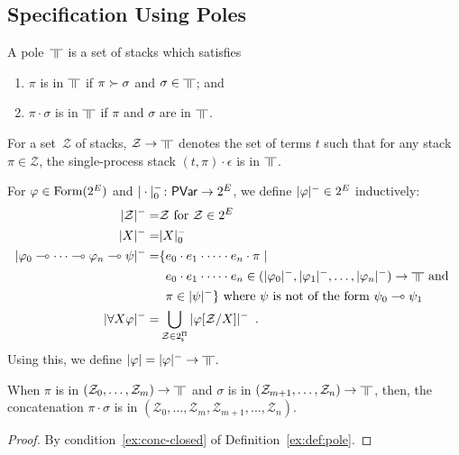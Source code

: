 \subsection{Specification Using Poles}

\begin{definition}
 \label{ex:def:pole}
A pole~$\bbot$ is a set of stacks
which satisfies
\begin{enumerate}
 \item \label{ex:red-closed} $\pi$ is in $\bbot$ if $\pi\succ \sigma$ and
       $\sigma\in\bbot$; and
 \item \label{ex:conc-closed} $\pi\cdot \sigma$ is in $\bbot$ if $\pi$
       and $\sigma$ are in $\bbot$.
\end{enumerate}
\end{definition}

For a set~$\mathcal Z$ of
stacks, $\mathcal Z\rightarrow\bbot$ denotes
the set of
terms
$t$ such that
for any
stack $\pi\in\mathcal Z$,
the single-process stack $(t,\pi)\cdot\epsilon$ is in $\bbot$.



For $\varphi\in\mathop{\text{Form}}(2^E)$ and $|\cdot|^-_0\colon\mathsf{PVar}\rightarrow 2^E$\kern
-2pt,
we define $|{\varphi}|^-\in
2^E$ inductively:
\begin{align*}
 \nsem{\mathcal Z} =& \mathcal Z \text{ for } \mathcal Z\in 2^E\\
 \nsem{X}=& |X|_0^- \\
 \nsem{\phi_0\limp\cdots\limp\phi_n\limp\psi}=&
 \{e_0\cdot e_1\cdot\cdots\cdot e_n\cdot\pi\mid \\ &\,\,\,  e_0\cdot
 e_1\cdot\cdots\cdot e_n
 \in(\nsem{\phi_0}, \nsem{\phi_1}, \ldots, \nsem{\phi_n})\rightarrow\bbot
 \text{ and  }
 \\&\,\,\,\pi\in\nsem\psi\}\text{ where }\psi\text{ is not of the form }\psi_0\limp\psi_1\\
 \nsem{\forall X\phi}=&
 \bigcup_{\mathcal Z\in 2^\sPi} \nsem{\phi[\mathcal Z/X]}\enspace.
\end{align*}
Using this, we define $\sem \phi=\nsem{\phi}\rightarrow\bbot$.
 \begin{proposition}
  \label{nsem-tuple}
  When $\pi$ is in
  $\left(\mathcal{Z}_0,\ldots,\mathcal{Z}_m\right)\rightarrow \bbot$
  and $\sigma$ is in
  $\left(\mathcal{Z}_{m+1},\ldots,\mathcal{Z}_n\right)\rightarrow \bbot$,
  then,
  the concatenation $\pi\cdot\sigma$ is in
  $\left(\mathcal{Z}_0,\ldots,\mathcal{Z}_m,
  \mathcal{Z}_{m+1},\ldots,\mathcal{Z}_n\right)$.
 \end{proposition}
  \begin{proof}
   By condition~\ref{ex:conc-closed} of Definition~\ref{ex:def:pole}.
  \end{proof}

